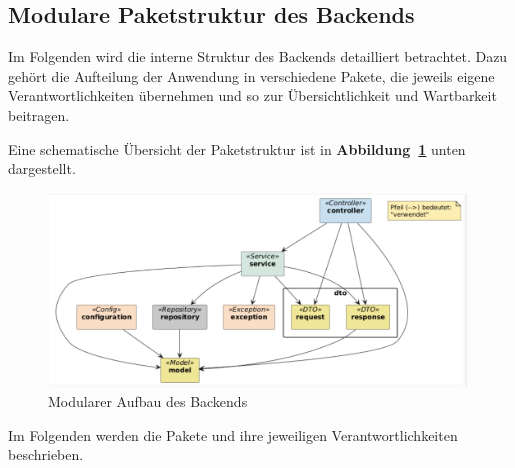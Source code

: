 \subsection{Modulare Paketstruktur des Backends}
Im Folgenden wird die interne Struktur des Backends detailliert betrachtet. Dazu gehört die Aufteilung der Anwendung in verschiedene Pakete, die jeweils eigene Verantwortlichkeiten übernehmen und so zur Übersichtlichkeit und Wartbarkeit beitragen.  

\noindent Eine schematische Übersicht der Paketstruktur ist in \textbf{Abbildung~\ref{fig:package-structure}} unten dargestellt.
\begin{figure}[H]
	\centering
	\includegraphics[width=0.99\textwidth]{images/backend_structure.png}
	\caption{Modularer Aufbau des Backends}
	\label{fig:package-structure}
\end{figure} 
\noindent Im Folgenden werden die Pakete und ihre jeweiligen Verantwortlichkeiten beschrieben.
